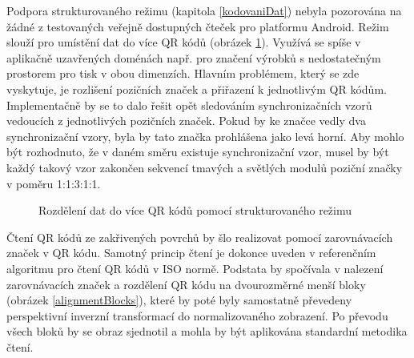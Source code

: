 Podpora strukturovaného režimu (kapitola \ref{kodovaniDat}) nebyla pozorována na žádné z
testovaných veřejně dostupných čteček pro platformu Android. Režim  slouží pro umístění
dat do více QR kódů (obrázek \ref{qrdiv}). Využívá se spíše v aplikačně
uzavřených doménách např. pro značení výrobků s nedostatečným prostorem pro tisk v obou
dimenzích. Hlavním problémem, který se zde vyskytuje, je rozlišení pozičních
značek a přiřazení k jednotlivým QR kódům. Implementačně by se to dalo řešit
opět sledováním synchronizačních vzorů vedoucích z jednotlivých pozičních
značek. Pokud by ke značce vedly dva synchronizační vzory, byla by tato
značka prohlášena jako levá horní. Aby mohlo být rozhodnuto, že v daném směru
existuje synchronizační vzor, musel by být každý takový vzor zakončen sekvencí
tmavých a světlých modulů poziční značky v poměru 1:1:3:1:1.

 \begin{figure}[H]
  \begin{center}
    \caption{Rozdělení dat do více QR kódů pomocí strukturovaného režimu}
    \label{qrdiv}
  \end{center}
\end{figure}

Čtení QR kódů ze zakřivených povrchů by šlo realizovat pomocí zarovnávacích
značek v QR kódu. Samotný princip čtení je dokonce uveden v referenčním
algoritmu pro čtení QR kódů v ISO normě. Podstata by spočívala v nalezení
zarovnávacích značek a rozdělení QR kódu na dvourozměrné menší bloky
(obrázek \ref{alignmentBlocks}), které by poté byly samostatně převedeny
perspektivní inverzní transformací do normalizovaného zobrazení. Po převodu všech bloků by se obraz
sjednotil a mohla by být aplikována standardní metodika čtení.
 
